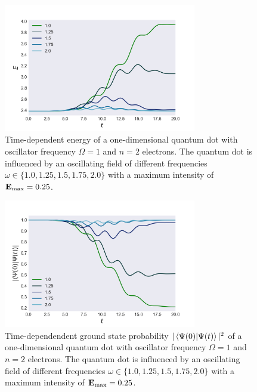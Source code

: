 \begin{figure}
    \centering
    \includegraphics[width=0.75\textwidth]{results/figures/1D/n2_resonance_energy.png} 
    \caption{Time-dependent energy of a one-dimensional quantum dot with
        oscillator frequency $\Omega=1$ and $n=2$ electrons.
        The quantum dot is influenced by an oscillating field of different 
        frequencies $\omega\in\{1.0, 1.25, 1.5, 1.75, 2.0\}$ with a maximum 
        intensity of $\vb{E}_\text{max} = 0.25$.
    }
    \label{fig:n2_1d_resonance_energy}
\end{figure}

\begin{figure}
    \centering
    \includegraphics[width=0.75\textwidth]{results/figures/1D/n2_resonance_overlap.png} 
    \caption{Time-dependendent ground state probability $|\braket{\Psi(0)}{\Psi(t)}|^2$
        of a one-dimensional quantum dot with
        oscillator frequency $\Omega=1$ and $n=2$ electrons.
        The quantum dot is influenced by an oscillating field of different 
        frequencies $\omega\in\{1.0, 1.25, 1.5, 1.75, 2.0\}$ with a maximum 
        intensity of $\vb{E}_\text{max} = 0.25$.
    }
    \label{fig:n2_1d_resonance_overlap}
\end{figure}

